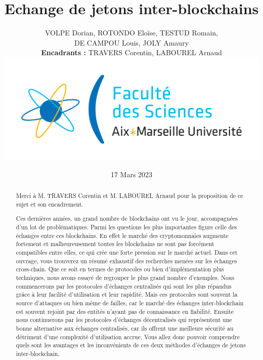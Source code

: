 \documentclass{article}
\newenvironment*{remerciements}{%
  \renewcommand*{\abstractname}{Remerciements}
  \begin{abstract}
}{
  \end{abstract}
}
\begin{document}
\title{Echange de jetons inter-blockchains}
\author{VOLPE Dorian, ROTONDO Eloïse, TESTUD Romain,\\DE CAMPOU Louis, JOLY Amaury  \\ \textbf{Encadrants :} TRAVERS Corentin, LABOUREL Arnaud \\ \includegraphics[scale=0.1]{./img/amu.png}}
\date{17 Mars 2023}

\begin{titlepage}
  \maketitle
\end{titlepage}

\begin{remerciements}
  Merci à M. TRAVERS Corentin et M. LABOUREL Arnaud pour la proposition de ce sujet et son encadrement.
\end{remerciements}
\begin{abstract}
  Ces dernières années, un grand nombre de blockchains ont vu le jour, accompagnées d’un lot de problématiques.
  Parmi les questions les plus importantes figure celle des échanges entre ces blockchains.
  En effet le marché des cryptomonnaies augmente fortement et malheureusement toutes les blockchains ne sont pas forcément compatibles entre elles, ce qui crée une forte pression sur le marché actuel.
  Dans cet ouvrage, vous trouverez un résumé exhaustif des recherches menées sur les échanges cross-chain.
  Que ce soit en termes de protocoles ou bien d'implémentation plus techniques, nous avons essayé de regrouper le plus grand nombre d'exemples.
  Nous commencerons par les protocoles d’échanges centralisés qui sont les plus répandus grâce à leur facilité d'utilisation et leur rapidité.
  Mais ces protocoles sont souvent la source d'attaques ou bien même de failles, car le marché des échanges inter-blockchain est souvent rejoint par des entités n'ayant pas de connaissance en fiabilité.
  Ensuite nous continuerons par les protocoles d'échanges décentralisés qui représentent une bonne alternative aux échanges centralisés, car ils offrent une meilleure sécurité au détriment d'une complexité d'utilisation accrue.
  Vous allez donc pouvoir comprendre quels sont les avantages et les inconvénients de ces deux méthodes d'échanges de jetons inter-blockchain.
\end{abstract}
\end{document}
